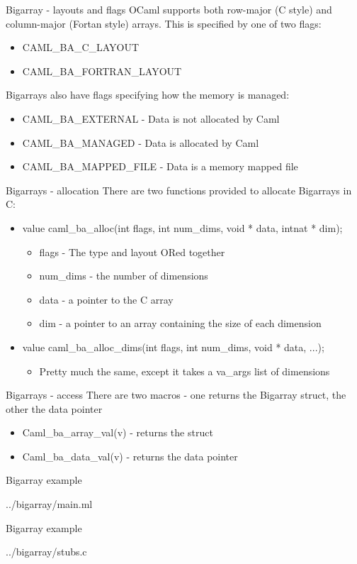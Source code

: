 \documentclass{beamer}
\begin{document}
\begin{frame}{Bigarray - layouts and flags}
OCaml supports both row-major (C style) and column-major (Fortan style) arrays.
This is specified by one of two flags:
\begin{itemize}
  \item CAML\_BA\_C\_LAYOUT
  \item CAML\_BA\_FORTRAN\_LAYOUT
\end{itemize}
Bigarrays also have flags specifying how the memory is managed:
\begin{itemize}
  \item CAML\_BA\_EXTERNAL - Data is not allocated by Caml
  \item CAML\_BA\_MANAGED - Data is allocated by Caml
  \item CAML\_BA\_MAPPED\_FILE - Data is a memory mapped file
\end{itemize}
\end{frame}

\begin{frame}{Bigarrays - allocation}
There are two functions provided to allocate Bigarrays in C:
\begin{itemize}
    \item value caml\_ba\_alloc(int flags, int num\_dims, void * data, intnat * dim);
    \begin{itemize}
        \item flags - The type and layout ORed together
        \item num\_dims - the number of dimensions
        \item data - a pointer to the C array
        \item dim - a pointer to an array containing the size of each dimension
    \end{itemize}
    \item value caml\_ba\_alloc\_dims(int flags, int num\_dims, void * data, ...);
    \begin{itemize}
        \item Pretty much the same, except it takes a va\_args list of dimensions
    \end{itemize}
\end{itemize}
\end{frame}

\begin{frame}{Bigarrays - access}
There are two macros - one returns the Bigarray struct, the other the data pointer
\begin{itemize}
    \item Caml\_ba\_array\_val(v) - returns the struct
    \item Caml\_ba\_data\_val(v) - returns the data pointer
\end{itemize}
\end{frame}

\begin{frame}[fragile,shrink=5]{Bigarray example}
\begin{lstinputlisting}[language=ML]{../bigarray/main.ml}
\end{lstinputlisting}
\end{frame}

\begin{frame}[fragile,shrink=5]{Bigarray example}
\begin{lstinputlisting}[language=C]{../bigarray/stubs.c}
\end{lstinputlisting}
\end{frame}
\end{document}
